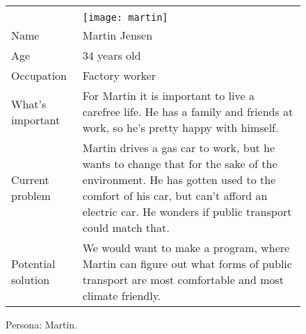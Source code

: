 \noindent
\begin{figure}[H]
    \centering
    \begin{tabularx}{\textwidth}{ | l X | }
        \hline
        &                                                \\
        & \texttt{[image: martin]} \\
        Name       & Martin Jensen                                  \\
        Age        & 34 years old                                   \\
        Occupation & Factory worker                                 \\
        What's important & For Martin it is important to live a carefree life.
        He has a family and friends at work, so he's pretty happy with himself. \\
        Current problem & Martin drives a gas car to work, but he wants to change that for the sake of the environment.
        He has gotten used to the comfort of his car, but can't afford an electric car.
        He wonders if public transport could match that. \\
        Potential solution & We would want to make a program, where Martin can figure out what forms of public transport are
        most comfortable and most climate friendly. \\
        \hline
    \end{tabularx}
    \caption{Persona: Martin.}
    \label{fig:persona_martin}
\end{figure}
